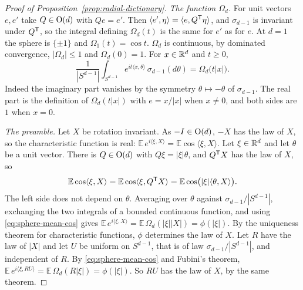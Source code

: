 \begin{proof}[Proof of Proposition~\ref{prop:radial-dictionary}]
\emph{The function $\Omega_d$.} For unit vectors $e, e'$ take $Q \in \mathrm{O}(d)$ with $Qe = e'$.
Then $\langle e',\eta\rangle = \langle e,Q^{\mathsf{T}}\eta\rangle$, and $\sigma_{d-1}$ is invariant
under $Q^{\mathsf{T}}$, so the integral defining $\Omega_d(t)$ is the same for $e'$ as for $e$. At
$d = 1$ the sphere is $\{\pm1\}$ and $\Omega_1(t) = \cos t$. $\Omega_d$ is continuous, by
dominated convergence, $|\Omega_d| \le 1$ and $\Omega_d(0) = 1$. For $x \in \mathbb{R}^d$ and $t \ge 0$,
\begin{equation}\label{eq:sphere-mean-cos}
  \frac{1}{|S^{d-1}|}\int_{S^{d-1}}e^{it\langle x,\theta\rangle}\,\sigma_{d-1}(d\theta)
   = \Omega_d\bigl(t|x|\bigr) .
\end{equation}
Indeed the imaginary part vanishes by the symmetry $\theta \mapsto -\theta$ of $\sigma_{d-1}$.
The real part is the definition of $\Omega_d(t|x|)$ with $e = x/|x|$ when $x \ne 0$, and both
sides are $1$ when $x = 0$.

\emph{The preamble.} Let $X$ be rotation invariant. As $-I \in \mathrm{O}(d)$, $-X$ has the law of
$X$, so the characteristic function is real:
$\mathbb{E}\,e^{i\langle\xi,X\rangle} = \mathbb{E}\cos\langle\xi,X\rangle$. Let $\xi \in \mathbb{R}^d$
and let $\theta$ be a unit vector. There is $Q \in \mathrm{O}(d)$ with $Q\xi = |\xi|\theta$, and
$Q^{\mathsf{T}}X$ has the law of $X$, so
\[
  \mathbb{E}\cos\langle\xi,X\rangle = \mathbb{E}\cos\langle\xi,Q^{\mathsf{T}}X\rangle
   = \mathbb{E}\cos\bigl(|\xi|\langle\theta,X\rangle\bigr) .
\]
The left side does not depend on $\theta$. Averaging over $\theta$ against
$\sigma_{d-1}/|S^{d-1}|$, exchanging the two integrals of a bounded continuous function, and using
\ref{eq:sphere-mean-cos} gives
$\mathbb{E}\,e^{i\langle\xi,X\rangle} = \mathbb{E}\,\Omega_d(|\xi||X|) = \phi(|\xi|)$. By the
uniqueness theorem for characteristic functions, $\phi$ determines the law of $X$. Let $R$ have
the law of $|X|$ and let $U$ be uniform on $S^{d-1}$, that is of law $\sigma_{d-1}/|S^{d-1}|$,
and independent of $R$. By \ref{eq:sphere-mean-cos} and Fubini's theorem,
$\mathbb{E}\,e^{i\langle\xi,RU\rangle} = \mathbb{E}\,\Omega_d(R|\xi|) = \phi(|\xi|)$. So $RU$ has
the law of $X$, by the same theorem.


\end{proof}
